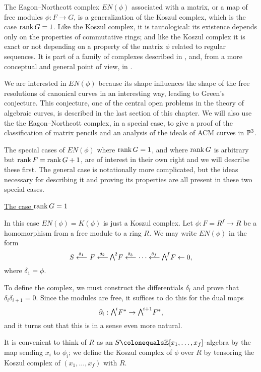 The Eagon--Northcott complex $EN(\phi)$ \cite{MR0142592} associated with
%
%
a matrix, or a map of free modules $\phi: F\to G$,
is a generalization of the Koszul complex, which is the case $\rank G =
\index{Koszul complex}%
1$. Like the Koszul complex,
it is tautological: its existence depends only on the properties
of commutative rings; and like the Koszul complex it is exact or
not depending on a property of the matrix $\phi$ related to regular
sequences. It is part of a family of complexes described in
\cite[Appendix A2]{Eisenbud1995}, and, from a more conceptual and general
point of view, in \cite{Weyman-book}.

We
are interested in $EN(\phi)$ because its shape
influences the shape of the free resolutions of canonical curves in an
interesting way,
leading to Green's conjecture. This conjecture, one of the central open
problems in the theory of algebraic curves, is described in the last
section of this chapter. We will also use the the Eagon--Northcott
complex, in a special case, to give a proof of the classification of
matrix pencils and an analysis of the ideals of ACM curves in $\mathbb P^{3}$.

The special cases of $EN(\phi)$ where $\operatorname{rank} G = 1$, and where
$\operatorname{rank} G$ is arbitrary but $\operatorname{rank} F = \operatorname{rank} G + 1$, are of interest in their
own right and we will describe these first. The general case
is notationally more complicated, but the  ideas necessary for
describing it and proving its properties
 are all
present in these two special cases.

\smallbreak
\noindent
\underline{The case $\operatorname{rank} G = 1$}
\smallbreak

In this case $EN(\phi) = K(\phi)$ is just a
 Koszul complex. Let $\phi:F = R^{f}\to R$ be a homomorphism from
a free module to a ring $R$. We may write $EN(\phi)$ in the form
$$
S \luto{\,\delta_{1}} \!F \luto{\,\delta_{2}}\!\! \mwedge^{2}F
\luto{\,\delta_{3}} \!\cdots \luto{\,\delta_{f}}\!\!\mwedge^{f}F\leftarrow 0, 
$$
where $\delta_{1} = \phi$.

To define the complex, we must construct the differentials $\delta_{i}$
and prove that
$\delta_{i}\delta_{i+1} = 0$. Since the modules are free, it suffices
to do this for the
dual maps
$$
\partial_{i}: \mwedge^{i}F^{*} \to \mwedge^{i+1}F^{*},
$$
and it turns out that this is in a sense even more natural.

It is convenient to think of $R$ as an $S \colonequals  \ZZ[x_{1},\dots,
x_{f}]$-algebra by the map sending
$x_{i}$ to $\phi_{i}$; we  define the Koszul complex of $\phi$ over $R$
%
by tensoring
the Koszul complex of $(x_{1}, \dots, x_{f})$ with $R$.

